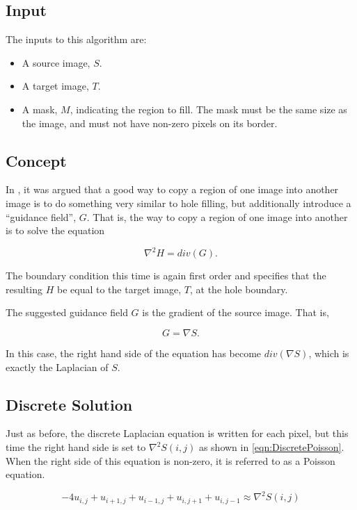 \documentclass{InsightArticle}
\begin{document}
\subsection{Input}
The inputs to this algorithm are:
\begin{itemize}
\item A source image, $S$.
\item A target image, $T$.
\item A mask, $M$, indicating the region to fill. The mask must be the same size as the image, and must not have non-zero pixels on its border.
\end{itemize}

\subsection{Concept}

In \cite{PoissonImageEditing}, it was argued that a good way to copy a region of one image into another image is to do something very similar to hole filling, but additionally introduce a ``guidance field'', $G$. That is, the way to copy a region of one image into another is to solve the equation

\begin{equation}
\nabla^2 H = div(G).
\end{equation}

The boundary condition this time is again first order and specifies that the resulting $H$ be equal to the target image, $T$, at the hole boundary.

The suggested guidance field $G$ is the gradient of the source image. That is,

\begin{equation}
G = \nabla S.
\end{equation}

In this case, the right hand side of the equation has become $div(\nabla S)$, which is exactly the Laplacian of $S$.

\subsection{Discrete Solution}
Just as before, the discrete Laplacian equation is written for each pixel, but this time the right hand side is set to $\nabla^2 S(i,j)$ as shown in \ref{eqn:DiscretePoisson}. When the right side of this equation is non-zero, it is referred to as a Poisson equation.

\begin{equation}
\label{eqn:DiscretePoisson}
-4 u_{i,j} + u_{i+1,j} + u_{i-1,j} + u_{i,j+1} + u_{i,j-1} \approx \nabla^2 S(i,j)
\end{equation}
\end{document}
